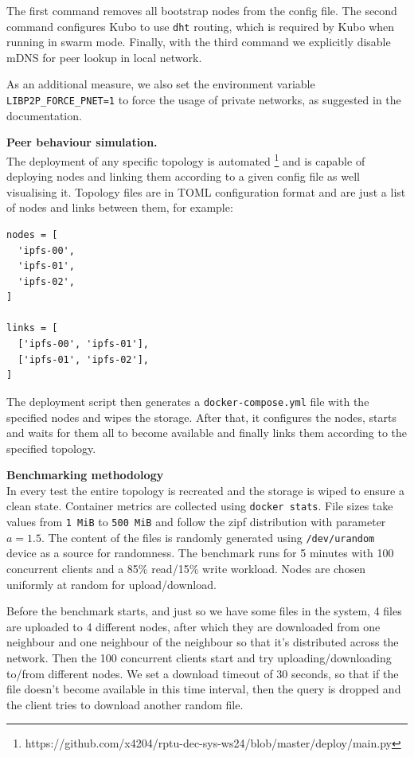 The first command removes all bootstrap nodes from the config file. The second
command configures Kubo to use \verb|dht| routing, which is required by Kubo
when running in swarm mode. Finally, with the third command we explicitly
disable mDNS for peer lookup in local network.

As an additional measure, we also set the environment variable
\verb|LIBP2P_FORCE_PNET=1| to force the usage of private networks, as suggested
in the documentation.

\textbf{Peer behaviour simulation.}\\
The deployment of any specific topology is automated
\footnote{https://github.com/x4204/rptu-dec-sys-ws24/blob/master/deploy/main.py}
and is capable of deploying nodes and linking them according to a given config
file as well visualising it. Topology files are in TOML configuration format
and are just a list of nodes and links between them, for example:
\begin{lstlisting}
nodes = [
  'ipfs-00',
  'ipfs-01',
  'ipfs-02',
]

links = [
  ['ipfs-00', 'ipfs-01'],
  ['ipfs-01', 'ipfs-02'],
]
\end{lstlisting}

The deployment script then generates a \verb|docker-compose.yml| file with the
specified nodes and wipes the storage. After that, it configures the nodes,
starts and waits for them all to become available and finally links them
according to the specified topology.

\textbf{Benchmarking methodology}\\
In every test the entire topology is recreated and the storage is wiped to
ensure a clean state. Container metrics are collected using
\verb|docker stats|. File sizes take values from \verb|1 MiB| to \verb|500 MiB|
and follow the zipf distribution with parameter $a=1.5$. The content of the
files is randomly generated using \verb|/dev/urandom| device as a source for
randomness. The benchmark runs for 5 minutes with 100 concurrent clients and a
85\% read/15\% write workload. Nodes are chosen uniformly at random for
upload/download.

Before the benchmark starts, and just so we have some files in the system, 4
files are uploaded to 4 different nodes, after which they are downloaded from
one neighbour and one neighbour of the neighbour so that it's distributed
across the network. Then the 100 concurrent clients start and try
uploading/downloading to/from different nodes. We set a download timeout of 30
seconds, so that if the file doesn't become available in this time interval,
then the query is dropped and the client tries to download another random file.


